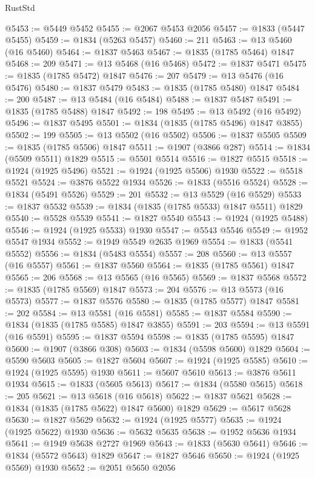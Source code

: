 \begin{lexlean}{RustStd}
\begin{coremodule}
{\begin{coremodule}
{{{{{@5453 := @5449 @5452
@5455 := @2067 @5453 @2056
@5457 := @1833 (@5447 @5455)
@5459 := @1834 (@5263 @5457)
@5460 := 211
@5463 := @13 @5460 (@16 @5460)
@5464 := @1837 @5463
@5467 := @1835 (@1785 @5464) @1847
@5468 := 209
@5471 := @13 @5468 (@16 @5468)
@5472 := @1837 @5471
@5475 := @1835 (@1785 @5472) @1847
@5476 := 207
@5479 := @13 @5476 (@16 @5476)
@5480 := @1837 @5479
@5483 := @1835 (@1785 @5480) @1847
@5484 := 200
@5487 := @13 @5484 (@16 @5484)
@5488 := @1837 @5487
@5491 := @1835 (@1785 @5488) @1847
@5492 := 198
@5495 := @13 @5492 (@16 @5492)
@5496 := @1837 @5495
@5501 := @1834 (@1835 (@1785 @5496) @1847 @3855)
@5502 := 199
@5505 := @13 @5502 (@16 @5502)
@5506 := @1837 @5505
@5509 := @1835 (@1785 @5506) @1847
@5511 := @1907 (@3866 @287)
@5514 := @1834 (@5509 @5511) @1829
@5515 := @5501 @5514
@5516 := @1827 @5515
@5518 := @1924 (@1925 @5496)
@5521 := @1924 (@1925 @5506) @1930
@5522 := @5518 @5521
@5524 := @3876 @5522 @1934
@5526 := @1833 (@5516 @5524)
@5528 := @1834 (@5491 @5526)
@5529 := 201
@5532 := @13 @5529 (@16 @5529)
@5533 := @1837 @5532
@5539 := @1834 (@1835 (@1785 @5533) @1847 @5511) @1829
@5540 := @5528 @5539
@5541 := @1827 @5540
@5543 := @1924 (@1925 @5488)
@5546 := @1924 (@1925 @5533) @1930
@5547 := @5543 @5546
@5549 := @1952 @5547 @1934
@5552 := @1949 @5549 @2635 @1969
@5554 := @1833 (@5541 @5552)
@5556 := @1834 (@5483 @5554)
@5557 := 208
@5560 := @13 @5557 (@16 @5557)
@5561 := @1837 @5560
@5564 := @1835 (@1785 @5561) @1847
@5565 := 206
@5568 := @13 @5565 (@16 @5565)
@5569 := @1837 @5568
@5572 := @1835 (@1785 @5569) @1847
@5573 := 204
@5576 := @13 @5573 (@16 @5573)
@5577 := @1837 @5576
@5580 := @1835 (@1785 @5577) @1847
@5581 := 202
@5584 := @13 @5581 (@16 @5581)
@5585 := @1837 @5584
@5590 := @1834 (@1835 (@1785 @5585) @1847 @3855)
@5591 := 203
@5594 := @13 @5591 (@16 @5591)
@5595 := @1837 @5594
@5598 := @1835 (@1785 @5595) @1847
@5600 := @1907 (@3866 @308)
@5603 := @1834 (@5598 @5600) @1829
@5604 := @5590 @5603
@5605 := @1827 @5604
@5607 := @1924 (@1925 @5585)
@5610 := @1924 (@1925 @5595) @1930
@5611 := @5607 @5610
@5613 := @3876 @5611 @1934
@5615 := @1833 (@5605 @5613)
@5617 := @1834 (@5580 @5615)
@5618 := 205
@5621 := @13 @5618 (@16 @5618)
@5622 := @1837 @5621
@5628 := @1834 (@1835 (@1785 @5622) @1847 @5600) @1829
@5629 := @5617 @5628
@5630 := @1827 @5629
@5632 := @1924 (@1925 @5577)
@5635 := @1924 (@1925 @5622) @1930
@5636 := @5632 @5635
@5638 := @1952 @5636 @1934
@5641 := @1949 @5638 @2727 @1969
@5643 := @1833 (@5630 @5641)
@5646 := @1834 (@5572 @5643) @1829
@5647 := @1827 @5646
@5650 := @1924 (@1925 @5569) @1930
@5652 := @2051 @5650 @2056
}}}}}
\end{coremodule}}
\end{coremodule}
\end{lexlean}
